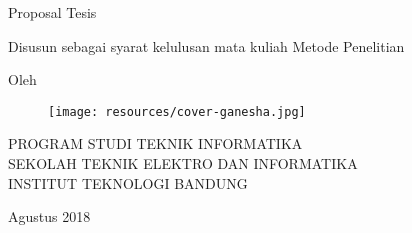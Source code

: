 \clearpage
\pagestyle{empty}

\begin{center}
\smallskip

    \Large \bfseries \MakeUppercase{\thetitle}
    \vfill

    \Large Proposal Tesis
    \vfill

    \large Disusun sebagai syarat kelulusan mata kuliah Metode Penelitian
    \vfill

    \large Oleh

    \Large \theauthor

    \vfill
    \begin{figure}[h]
        \centering
      	\texttt{[image: resources/cover-ganesha.jpg]}
    \end{figure}
    \vfill

    \large
    \uppercase{
        Program Studi Teknik Informatika \\
        Sekolah Teknik Elektro dan Informatika \\
        Institut Teknologi Bandung
    }

    Agustus 2018

\end{center}

\clearpage
